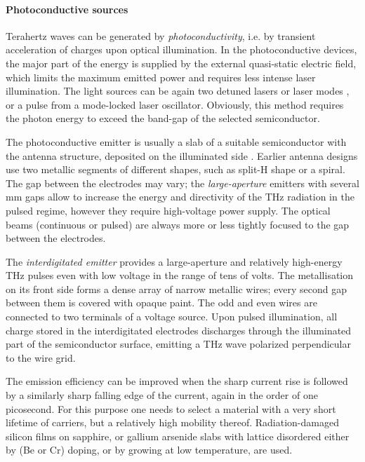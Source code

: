 \paragraph{Photoconductive sources}%
Terahertz waves can be generated by \textit{photoconductivity}, i.e. by transient acceleration of charges upon optical illumination.
In the photoconductive devices, the major part of the energy is supplied by the external quasi-static electric field, which limits the maximum emitted power and requires less intense laser illumination. The light sources can be again two detuned lasers or laser modes \cite{gu1999generation}, or a pulse from a mode-locked laser oscillator. Obviously, this method requires the photon energy to exceed the band-gap of the selected semiconductor.

The photoconductive emitter is usually a slab of a suitable semiconductor with the antenna structure, deposited on the illuminated side \cite{auston1984picosecond}. Earlier antenna designs use two metallic segments of different shapes, such as split-H shape or a spiral. The gap between the electrodes may vary; the \textit{large-aperture} emitters with several mm gaps %
allow to increase the energy and directivity of the THz radiation in the pulsed regime, however they require high-voltage power supply.
The optical beams (continuous or pulsed) are always more or less tightly focused to the gap between the electrodes. 

The \textit{interdigitated emitter} \cite{darrow1990subpicosecond,hu1990optically} 
provides a large-aperture and relatively high-energy THz pulses even with low voltage in the range of tens of volts. The metallisation on its front side forms a dense array of narrow metallic wires; every second gap between them is covered with opaque paint. The odd and even wires are connected to two terminals of a voltage source.  Upon pulsed illumination, all charge stored in the interdigitated electrodes discharges through the illuminated part of the semiconductor surface, emitting a THz wave polarized perpendicular to the wire grid.

The emission efficiency can be improved when the sharp current rise is followed by a similarly sharp falling edge of the current, again in the order of one picosecond. For this purpose one needs to select a material with a very short lifetime of carriers, but a relatively high mobility thereof. Radiation-damaged silicon films on sapphire, or gallium arsenide slabs with lattice disordered either by (Be or Cr) doping, or by growing at low temperature, are used. 

